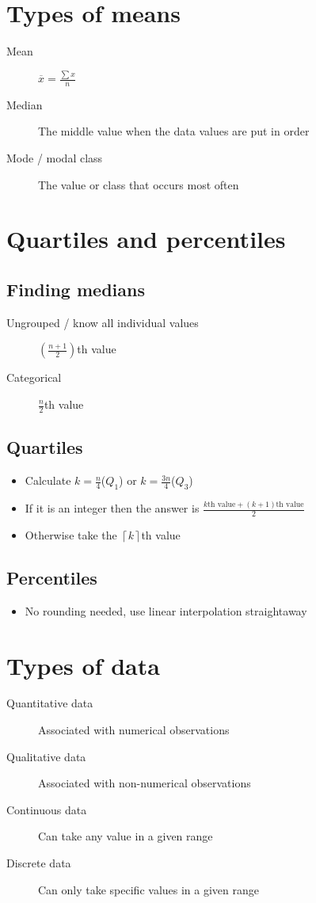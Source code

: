 \section{Types of means}
\begin{description}
    \item[Mean] $\overline{x}=\frac{\sum x}{n}$
    \item[Median] The middle value when the data values are put in order
    \item[Mode / modal class] The value or class that occurs most often
\end{description}

\section{Quartiles and percentiles}
\subsection{Finding medians}
\begin{description}
    \item[Ungrouped / know all individual values] $\left(\frac{n+1}{2}\right)$th value
    \item[Categorical] $\frac{n}{2}$th value
\end{description}

\subsection{Quartiles}
\begin{itemize}
    \item Calculate $k=\frac{n}{4}$($Q_1$) or $k=\frac{3n}{4}$($Q_3$)
    \item If it is an integer then the answer is $\frac{\text{$k$th value} + \text{$(k+1)$th value}}{2}$
    \item Otherwise take the $\left\lceil k \right\rceil$th value
\end{itemize}

\subsection{Percentiles}
\begin{itemize}
    \item No rounding needed, use linear interpolation straightaway
\end{itemize}


\section{Types of data}
\begin{description}
    \item[Quantitative data] Associated with numerical observations
    \item[Qualitative data] Associated with non-numerical observations
    \item[Continuous data] Can take any value in a given range
    \item[Discrete data] Can only take specific values in a given range
\end{description}

